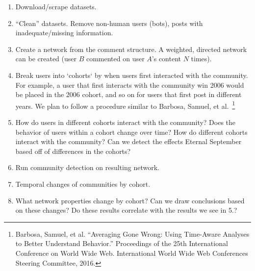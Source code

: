 \documentclass{tufte-handout}
\begin{document}
\begin{enumerate}
\item Download/scrape datasets.
\item ``Clean'' datasets. Remove non-human users (bots), posts with inadequate/missing information.
\item Create a network from the comment structure. A weighted, directed network can be created (user $B$ commented on user $A$'s content $N$ times).
\item Break users into `cohorts` by when users first interacted with the community. For example, a user that first interacts with the community win 2006 would be placed in the 2006 cohort, and so on for users that first post in different years. We plan to follow a procedure similar to Barbosa, Samuel, et al.~\footnote{Barbosa, Samuel, et al. ``Averaging Gone Wrong: Using Time-Aware Analyses to Better Understand Behavior.'' Proceedings of the 25th International Conference on World Wide Web. International World Wide Web Conferences Steering Committee, 2016.}
\item How do users in different cohorts interact with the community? Does the behavior of users within a cohort change over time? How do different cohorts interact with the community? Can we detect the effects Eternal September based off of differences in the cohorts?
\item Run community detection on resulting network.
\item Temporal changes of communities by cohort.
\item What network properties change by cohort? Can we draw conclusions based on these changes? Do these results correlate with the results we see in 5.?
\end{enumerate}
\end{document}
